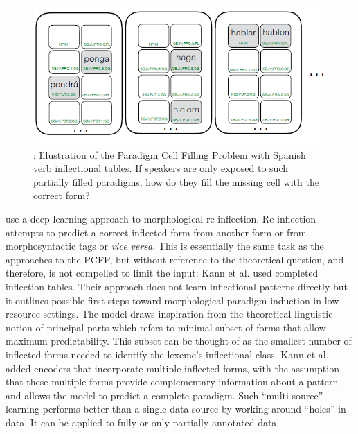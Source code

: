 \documentclass[12pt]{article}
\begin{document}
\begin{figure}[ht]
\label{fig:PCFP}
\begin{center}
\includegraphics[width=0.7\columnwidth]{PCFP.PNG}
\caption{: Illustration of the Paradigm Cell Filling Problem with Spanish verb inflectional tables. If speakers are only exposed to such partially filled paradigms, how do they fill the missing cell with the correct form?}
\end{center}
\end{figure}

 use a deep learning approach to morphological re-inflection. Re-inflection attempts to predict a correct inflected form from another form or from morphosyntactic tags or \textit{vice versa}. This is essentially the same task as the approaches to the PCFP, but without reference to the theoretical question, and therefore, is not compelled to limit the input: Kann et al. used completed inflection tables. Their approach does not learn inflectional patterns directly but it outlines possible first steps toward morphological paradigm induction in low resource settings. The model draws inspiration from the theoretical linguistic notion of principal parts \cite{finkel_principal_2007} which refers to minimal subset of forms that allow maximum predictability. This subset can be thought of as the smallest number of inflected forms needed to identify the lexeme's inflectional class. Kann et al. added encoders that incorporate multiple inflected forms, with the assumption that these multiple forms provide complementary information about a pattern and allows the model to predict a complete paradigm. Such ``multi-source'' learning performs better than a single data source by working around ``holes” in data. It can be applied to fully or only partially annotated data.
\end{document}
